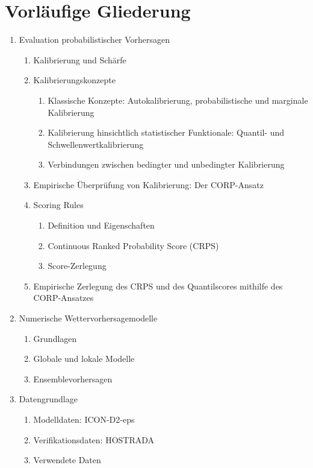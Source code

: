 \documentclass{article}
\numberwithin{equation}{section}
\begin{document}
\section{Vorläufige Gliederung}
\begin{enumerate}
\item Evaluation probabilistischer Vorhersagen
\begin{enumerate}
    \item Kalibrierung und Schärfe
    \item Kalibrierungskonzepte
    \begin{enumerate}
        \item Klassische Konzepte: Autokalibrierung, probabilistische und marginale Kalibrierung
        \item Kalibrierung hinsichtlich statistischer Funktionale: Quantil- und Schwellenwertkalibrierung
        \item Verbindungen zwischen bedingter und unbedingter Kalibrierung
    \end{enumerate}
    \item Empirische Überprüfung von Kalibrierung: Der CORP-Ansatz
    \item Scoring Rules
    \begin{enumerate}
        \item Definition und Eigenschaften
        \item Continuous Ranked Probability Score (CRPS)
        \item Score-Zerlegung
    \end{enumerate}
    \item Empirische Zerlegung des CRPS und des Quantilscores mithilfe des CORP-Ansatzes
\end{enumerate}

\item Numerische Wettervorhersagemodelle
\begin{enumerate}
    \item Grundlagen
    \item Globale und lokale Modelle
    \item Ensemblevorhersagen
\end{enumerate}

\item Datengrundlage
\begin{enumerate}
    \item Modelldaten: ICON-D2-eps
    \item Verifikationsdaten: HOSTRADA
    \item Verwendete Daten
\end{enumerate}


\end{enumerate}
\end{document}
